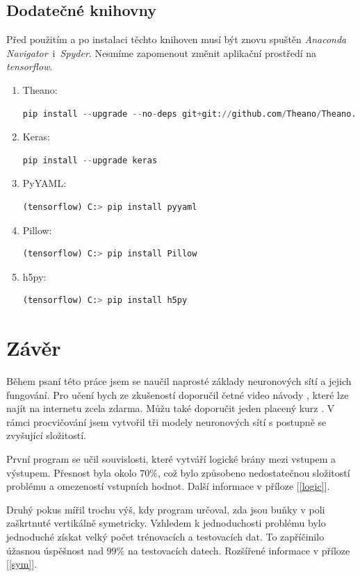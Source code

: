 \documentclass[12pt,a4paper]{report}
\begin{document}
\section{Dodatečné knihovny}
Před použitím a po instalaci těchto knihoven musí být znovu spuštěn \textit{Anaconda Navigator}~i~\textit{Spyder}. Nesmíme zapomenout změnit aplikační prostředí na \textit{tensorflow}.
\begin{enumerate}
	\item Theano:
	\begin{lstlisting}[language=Python]
pip install --upgrade --no-deps git+git://github.com/Theano/Theano.git
	\end{lstlisting}
	\item Keras:
	\begin{lstlisting}[language=Python]
pip install --upgrade keras
	\end{lstlisting}
	\item PyYAML:
	\begin{lstlisting}[language=Python]
(tensorflow) C:> pip install pyyaml
	\end{lstlisting}
	\item Pillow:
	\begin{lstlisting}[language=Python]
(tensorflow) C:> pip install Pillow
	\end{lstlisting}
	\item h5py:
	\begin{lstlisting}[language=Python]
(tensorflow) C:> pip install h5py
	\end{lstlisting}
\end{enumerate}
	
	
\chapter{Závěr}
Během psaní této práce jsem se naučil naprosté základy neuronových sítí a jejich fungování. Pro učení bych ze zkušeností doporučil četné video návody \cite{3blue1brown} \cite{welch_labs}, které lze najít na internetu zcela zdarma. Můžu také doporučit jeden placený kurz \cite{udemy}. V rámci procvičování jsem vytvořil tři modely neuronových sítí s postupně se zvyšující složitostí.

První program se učil souvislosti, které vytváří logické brány mezi vstupem a výstupem. Přesnost byla okolo $70\%$, což bylo způsobeno nedostatečnou složitostí problému a omezeností vstupních hodnot. Další informace v příloze [\ref{logic}].

Druhý pokus mířil trochu výš, kdy program určoval, zda jsou buňky v poli zaškrtnuté vertikálně symetricky. Vzhledem k jednoduchosti problému bylo jednoduché získat velký počet trénovacích a testovacích dat. To zapříčinilo úžasnou úspěšnost nad $99\%$ na testovacích datech. Rozšířené informace v příloze [\ref{sym}].
\end{document}
